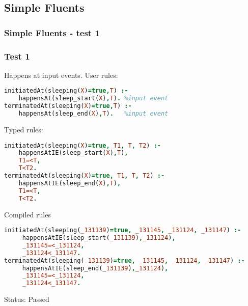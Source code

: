 \documentclass[8pt]{beamer}
\begin{document}
\subsection{Simple Fluents}
\begin{frame}[fragile]
\frametitle{Simple Fluents - test 1}
\subsubsection{Test 1}
\small
Happens at input events.\linebreak
User rules:
\begin{tiny}
\begin{lstlisting}[language=Prolog]
initiatedAt(sleeping(X)=true,T) :-
    happensAt(sleep_start(X),T). %input event
terminatedAt(sleeping(X)=true,T) :-
    happensAt(sleep_end(X),T).   %input event
\end{lstlisting}
\end{tiny}
Typed rules:
\begin{tiny}
\begin{lstlisting}[language=Prolog]
initiatedAt(sleeping(X)=true, T1, T, T2) :-
    happensAtIE(sleep_start(X),T),
    T1=<T,
    T<T2.
terminatedAt(sleeping(X)=true, T1, T, T2) :-
    happensAtIE(sleep_end(X),T),
    T1=<T,
    T<T2.
\end{lstlisting}
\end{tiny}
Compiled rules
\begin{tiny}
\begin{lstlisting}[language=Prolog]
initiatedAt(sleeping(_131139)=true, _131145, _131124, _131147) :-
     happensAtIE(sleep_start(_131139),_131124),
     _131145=<_131124,
     _131124<_131147.
terminatedAt(sleeping(_131139)=true, _131145, _131124, _131147) :-
     happensAtIE(sleep_end(_131139),_131124),
     _131145=<_131124,
     _131124<_131147.
\end{lstlisting}
\end{tiny}
Status: Passed
\end{frame}
\end{document}
